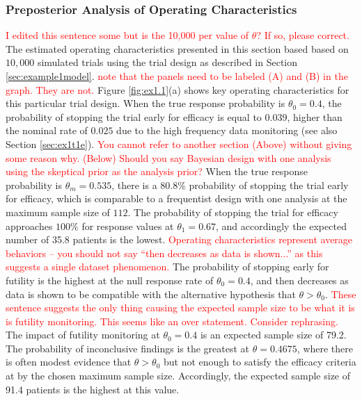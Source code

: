 \documentclass[useAMS,usenatbib,referee]{biom}
\begin{document}
\subsubsection{Preposterior Analysis of Operating Characteristics}\label{sec:ex1.1}
\textcolor{red}{I edited this sentence some but is the 10,000 per value of $\theta$? If so, please correct.}
The estimated operating characteristics presented in this section based based on $10,000$ simulated trials using the trial design as described in Section \ref{sec:example1model}. 
%
\textcolor{red}{note that the panels need to be labeled (A) and (B) in the graph. They are not.}
Figure \ref{fig:ex1.1}(a) shows key operating characteristics for this particular trial design.
%
When the true response probability is $\theta_0=0.4$, the probability of stopping the trial early for efficacy is equal to $0.039$, higher than the nominal rate of 
$0.025$ due to the high frequency data monitoring (see also Section \ref{sec:ex1t1e}). 
%
\textcolor{red}{You cannot refer to another section (Above) without giving some reason why. 
(Below) Should you say Bayesian design with one analysis using the skeptical prior as the analysis prior?}
%
When the true response probability is $\theta_m=0.535$, there is a $80.8\%$ probability of stopping the trial early for efficacy, which is comparable to a frequentist design with one analysis at the maximum sample size of $112$. 
%
The probability of stopping the trial for efficacy approaches $100\%$ for response values at $\theta_1=0.67$, and accordingly the expected number of 35.8 patients is the lowest.
%
\textcolor{red}{Operating characteristics represent average behaviors -- you should not say ``then decreases as data is shown...'' as this suggests a single dataset phenomenon.}
%
The probability of stopping early for futility is the highest at the null response rate of $\theta_0=0.4$, and then decreases as data is shown to be compatible with the alternative hypothesis that $\theta>\theta_0$. 
%
\textcolor{red}{These sentence suggests the only thing causing the expected sample size to be what it is is futility monitoring. This seems like an over statement. Consider rephrasing.}
%
The impact of futility monitoring at $\theta_0=0.4$ is an expected sample size of 79.2.
%
The probability of inconclusive findings is the greatest at $\theta=0.4675$, where there is often modest evidence that $\theta>\theta_0$ but not enough to satisfy the efficacy criteria at by the chosen maximum sample size. Accordingly, the expected sample size of 91.4 patients is the highest at this value.
\end{document}
